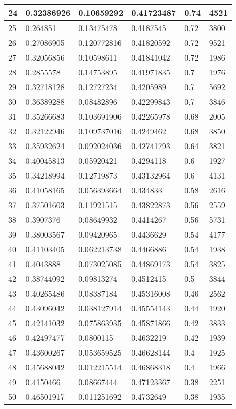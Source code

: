 \begin{longtable}{|l|l|l|l|l|l|}
24 & 0.32386926 & 0.10659292 & 0.41723487 & 0.74 & 4521 \\ \hline 
25 & 0.264851 & 0.13475478 & 0.4187545 & 0.72 & 3800 \\ \hline 
26 & 0.27086905 & 0.120772816 & 0.41820592 & 0.72 & 9521 \\ \hline 
27 & 0.32056856 & 0.10598611 & 0.41841042 & 0.72 & 1986 \\ \hline 
28 & 0.2855578 & 0.14753895 & 0.41971835 & 0.7 & 1976 \\ \hline 
29 & 0.32718128 & 0.12727234 & 0.4205989 & 0.7 & 5692 \\ \hline 
30 & 0.36389288 & 0.08482896 & 0.42299843 & 0.7 & 3846 \\ \hline 
31 & 0.35266683 & 0.103691906 & 0.42265978 & 0.68 & 2005 \\ \hline 
32 & 0.32122946 & 0.109737016 & 0.4249462 & 0.68 & 3850 \\ \hline 
33 & 0.35932624 & 0.092024036 & 0.42741793 & 0.64 & 3821 \\ \hline 
34 & 0.40045813 & 0.05920421 & 0.4294118 & 0.6 & 1927 \\ \hline 
35 & 0.34218994 & 0.12719873 & 0.43132964 & 0.6 & 4131 \\ \hline 
36 & 0.41058165 & 0.056393664 & 0.434833 & 0.58 & 2616 \\ \hline 
37 & 0.37501603 & 0.11921515 & 0.43822873 & 0.56 & 2559 \\ \hline 
38 & 0.3907376 & 0.08649932 & 0.4414267 & 0.56 & 5731 \\ \hline 
39 & 0.38003567 & 0.09420965 & 0.4436629 & 0.54 & 4177 \\ \hline 
40 & 0.41103405 & 0.062213738 & 0.4466886 & 0.54 & 1938 \\ \hline 
41 & 0.4043888 & 0.073025085 & 0.44869173 & 0.54 & 3825 \\ \hline 
42 & 0.38744092 & 0.09813274 & 0.4512415 & 0.5 & 3844 \\ \hline 
43 & 0.40265486 & 0.08387184 & 0.45316008 & 0.46 & 2562 \\ \hline 
44 & 0.43096042 & 0.038127914 & 0.45554143 & 0.44 & 1920 \\ \hline 
45 & 0.42141032 & 0.075863935 & 0.45871866 & 0.42 & 3833 \\ \hline 
46 & 0.42497477 & 0.0800115 & 0.4632219 & 0.42 & 1939 \\ \hline 
47 & 0.43600267 & 0.053659525 & 0.46628144 & 0.4 & 1925 \\ \hline 
48 & 0.45688042 & 0.012215514 & 0.46868318 & 0.4 & 1966 \\ \hline 
49 & 0.4150466 & 0.08667444 & 0.47123367 & 0.38 & 2251 \\ \hline 
50 & 0.46501917 & 0.011251692 & 0.4732649 & 0.38 & 1935 \\ \hline 
\end{longtable}